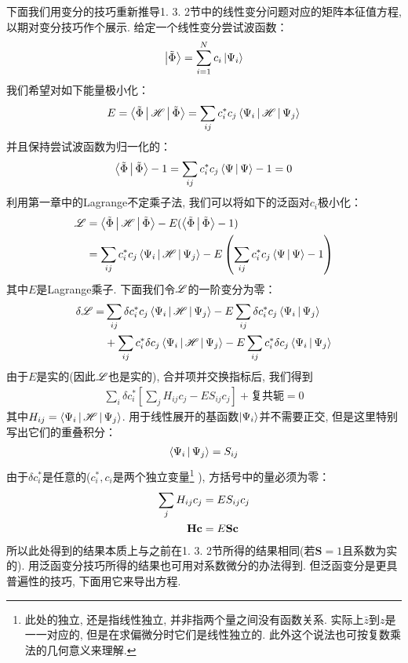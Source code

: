 下面我们用变分的技巧重新推导1.
3.
2节中的线性变分问题对应的矩阵本征值方程, 
以期对变分技巧作个展示. 
给定一个线性变分尝试波函数：
\begin{align}
	\Ket{\tilde{\Phi}} = \sum_{i=1}^{N}c_i\Ket{\Psi_i}
\end{align}
我们希望对如下能量极小化：
\begin{align}
	E = \Braket{\tilde{\Phi}|\mathscr{H}|\tilde{\Phi}} = \sum_{ij} c_i^*c_j\Braket{\Psi_i|\mathscr{H}|\Psi_j}
\end{align}
并且保持尝试波函数为归一化的：
\begin{align}
	\Braket{\tilde{\Phi}|\tilde{\Phi}} - 1 = \sum_{ij}c_i^*c_j \Braket{\Psi|\Psi} - 1 = 0
\end{align}
利用第一章中的Lagrange不定乘子法, 
我们可以将如下的泛函对$c_i$极小化：
\begin{align}
	\mathscr{L} & = \Braket{\tilde{\Phi}|\mathscr{H}|\tilde{\Phi}} - E(\Braket{\tilde{\Phi}|\tilde{\Phi}}-1) \notag\\
	& = \sum_{ij}c_i^*c_j\Braket{\Psi_i|\mathscr{H}|\Psi_j} - E\left( \sum_{ij}c_i^*c_j \Braket{\Psi|\Psi} - 1 \right)
\end{align}
其中$E$是Lagrange乘子. 
下面我们令$\mathscr{L}$的一阶变分为零：
\begin{align}
	\delta\mathscr{L} = & \sum_{ij}\delta c_i^*c_j\Braket{\Psi_i|\mathscr{H}|\Psi_j} - E\sum_{ij}\delta c_i^*c_j\Braket{\Psi_i|\Psi_j} \notag \\
	& +  \sum_{ij}c_i^*\delta c_j\Braket{\Psi_i|\mathscr{H}|\Psi_j} - E\sum_{ij}c_i^*\delta c_j\Braket{\Psi_i|\Psi_j}
\end{align}
由于$E$是实的(因此$\mathscr{L}$也是实的), 
合并项并交换指标后, 
我们得到
\begin{align}
	\sum_i\delta c_i^*\left[ \sum_j H_{ij}c_j - ES_{ij}c_j \right] + \text{复共轭} = 0
\end{align}
其中$H_{ij} = \Braket{\Psi_i|\mathscr{H}|\Psi_j}$. 
用于线性展开的基函数$\Ket{\Psi_i}$并不需要正交, 
但是这里特别写出它们的重叠积分：
\begin{align}
	\Braket{\Psi_i|\Psi_j} = S_{ij}
\end{align}
由于$\delta c_i^*$是任意的($c_i^*,c_i$是两个独立变量\footnote{
	此处的独立, 还是指线性独立, 并非指两个量之间没有函数关系. 
	实际上$\bar{z}$到$z$是一一对应的, 但是在求偏微分时它们是线性独立的. 
	此外这个说法也可按复数乘法的几何意义来理解.}
), 方括号中的量必须为零：
\begin{align}
	\sum_j H_{ij}c_j & = ES_{ij}c_j \notag\\
	\mathbf{Hc} & = E\mathbf{Sc}
\end{align}
所以此处得到的结果本质上与之前在1.
3.
2节所得的结果相同(若$\mathbf{S}=1$且系数为实的). 
用泛函变分技巧所得的结果也可用对系数微分的办法得到. 
但泛函变分是更具普遍性的技巧, 
下面用它来导出\hft 方程. 

